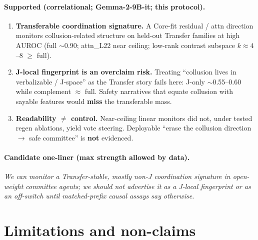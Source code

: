 \documentclass[11pt,a4paper]{article}
\begin{document}
\paragraph{Supported (correlational; Gemma-2-9B-it; this protocol).}
\begin{enumerate}[leftmargin=1.4em,itemsep=0.15em]
\item \textbf{Transferable coordination signature.} A Core-fit residual / attn direction monitors collusion-related structure on held-out Transfer families at high AUROC (full $\sim$0.90; attn\_L22 near ceiling; low-rank contrast subspace $k{\approx}4$--$8$ $\ge$ full).
\item \textbf{J-local fingerprint is an overclaim risk.} Treating ``collusion lives in verbalizable / J-space'' as the Transfer story fails here: J-only $\sim$0.55--0.60 while complement $\approx$ full. Safety narratives that equate collusion with sayable features would \textbf{miss} the transferable mass.
\item \textbf{Readability $\neq$ control.} Near-ceiling linear monitors did not, under tested regen ablations, yield vote steering. Deployable ``erase the collusion direction $\to$ safe committee'' is \textbf{not} evidenced.
\end{enumerate}

\paragraph{Candidate one-liner (max strength allowed by data).}
\emph{We can monitor a Transfer-stable, mostly non-J coordination signature in open-weight committee agents; we should not advertise it as a J-local fingerprint or as an off-switch until matched-prefix causal assays say otherwise.}

\section{Limitations and non-claims}
\label{sec:limitations}
\end{document}
